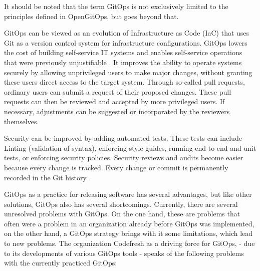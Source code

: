 \noindent
It should be noted that the term GitOps is not exclusively limited to
the principles defined in OpenGitOps,
but goes beyond that.
\bigskip

\noindent
GitOps can be viewed as an evolution of Infrastructure as Code (IaC) that uses Git as a version control system for infrastructure configurations.
GitOps lowers the cost of building self-service IT systems and enables self-service operations that were previously unjustifiable
\autocite{limoncelli_gitopsPathToMoreSelfService}.
It improves the ability to operate systems securely by
allowing unprivileged users to make major changes,
without granting these users direct access to the target system.
Through so-called pull requests, ordinary users can submit a request
of their proposed changes.
These pull requests can then be reviewed and accepted by more privileged users.
If necessary, adjustments can be suggested or incorporated by the reviewers themselves.
\bigskip

\noindent
Security can be improved by adding automated tests.
These tests can include
Linting (validation of syntax),
enforcing style guides,
running end-to-end and unit tests,
or
enforcing security policies.
Security reviews and audits become easier 
because every change is tracked.
Every change or commit is permanently recorded in the Git history
\autocite{limoncelli_gitopsPathToMoreSelfService}.
\bigskip


\noindent
GitOps as a practice for releasing software has several advantages,
but like other solutions, GitOps also has several shortcomings.
Currently, there are several unresolved problems with GitOps.
On the one hand, these are problems that often 
were a problem in an organization already before GitOps was implemented,
on the other hand, a GitOps strategy brings with it some limitations,
which lead to new problems.
The organization Codefresh
as a driving force for GitOps,
- due to its developments
of various GitOps tools -
speaks of the following problems with the currently practiced GitOps:

